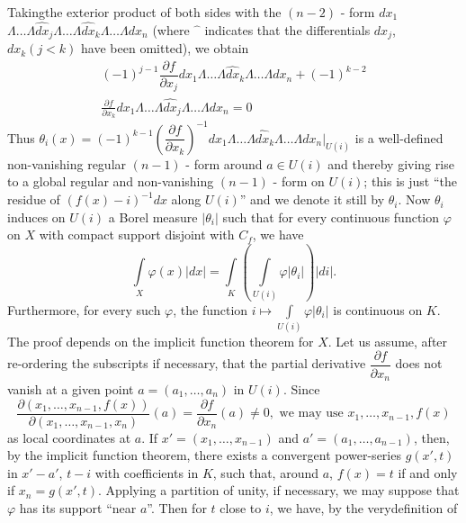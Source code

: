 Taking\pageoriginale the exterior product of both sides with the
$(n-2)$ - form $dx_{1}$ $\Lambda\ldots\Lambda
\hat{dx}_{j}\Lambda\ldots\Lambda
\hat{dx}_{k}\Lambda\ldots\Lambda dx_{n}$ (where
$\hat{\phantom{a}}$ indicates that the differentials $dx_{j}$,
$dx_{k}(j<k)$ have been omitted), we obtain 
\begin{multline*}
  (-1)^{j-1}\dfrac{\partial f}{\partial x_{j}}dx_{1}\Lambda\ldots\Lambda
  \hat{dx}_{k}\Lambda\ldots\Lambda dx_{n}+(-1)^{k-2}\\
  \frac{\partial f}{\partial
  x_{k}}dx_{1} \Lambda\ldots\Lambda \hat{dx}_{j}\Lambda
  \ldots\Lambda dx_{n}=0 
\end{multline*}
Thus $\theta_{i}(x)=(-1)^{k-1}\left(\dfrac{\partial f}{\partial
  x_{k}}\right)^{-1}dx_{1}\Lambda\ldots\Lambda\hat{dx}_{k}\Lambda\ldots\Lambda
dx_{n}|_{U(i)}$ is a well-defined non-vanishing regular $(n-1)$ - form
around $a\in U(i)$ and thereby giving rise to a global regular and
non-vanishing $(n-1)$ - form on $U(i)$; this is just ``the residue of
$(f(x)-i)^{-1}dx$ along $U(i)$'' and we denote it still by
$\theta_{i}$. Now $\theta_{i}$ induces on $U(i)$ a Borel measure
$|\theta_{i}|$ such that for every continuous function $\varphi$ on
$X$ with compact support disjoint with $C_{f}$, we have 
\begin{equation*}
  \int\limits_{X}\varphi(x)|dx|=\int\limits_{K}\left(\int\limits_{U(i)}
  \varphi|\theta_{i}|\right)|di|.\tag{72}\label{chap3:sec1:subsec3:eq72}
\end{equation*} 
Furthermore, for every such $\varphi$, the function $i\mapsto
\int\limits_{U(i)}\varphi|\theta_{i}|$ is continuous on $K$. The proof
depends on the implicit function theorem for $X$. Let us assume, after
re-ordering the subscripts if necessary, that the partial derivative
$\dfrac{\partial f}{\partial x_{n}}$ does not vanish at a given point
$a=(a_{1},\ldots,a_{n})$ in $U(i)$. Since 
$$
\dfrac{\partial(x_{1},\ldots,x_{n-1},f(x))}{\partial
  (x_{1},\ldots,x_{n-1},x_{n})}(a)=\frac{\partial f}{\partial
  x_{n}}(a)\neq 0,\text{ \ we may use \ } x_{1},\ldots,x_{n-1}, f(x)
$$
as local coordinates at $a$. If $x'=(x_{1},\ldots,x_{n-1})$ and
$a'=(a_{1},\ldots,a_{n-1})$, then, by the implicit function theorem,
there exists a convergent power-series $g(x',t)$ in $x'-a'$, $t-i$
with coefficients in $K$, such that, around $a$, $f(x)=t$ if and only
if $x_{n}=g(x',t)$. Applying a partition of unity, if necessary, we
may suppose that $\varphi$ has its support ``near $a$''. Then for $t$
close to $i$, we have, by the very\pageoriginale definition of
